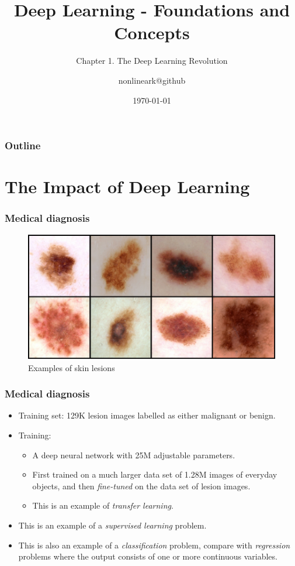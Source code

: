 \documentclass{beamer}
\title{Deep Learning - Foundations and Concepts}
\subtitle{Chapter 1. The Deep Learning Revolution}
\author{nonlineark@github}
\date{\today}
\begin{document}
\begin{frame}
    \titlepage
\end{frame}

\begin{frame}
    \frametitle{Outline}
    \tableofcontents
\end{frame}

\section{The Impact of Deep Learning}

\begin{frame}
    \frametitle{Medical diagnosis}
    \begin{figure}
        \caption{Examples of skin lesions}
        \includegraphics{Figure_1.pdf}
    \end{figure}
\end{frame}

\begin{frame}
    \frametitle{Medical diagnosis}
    \begin{itemize}
        \item Training set: 129K lesion images labelled as either malignant or benign.
        \item Training:
        \begin{itemize}
            \item A deep neural network with 25M adjustable parameters.
            \item First trained on a much larger data set of 1.28M images of everyday objects, and then \emph{fine-tuned} on the data set of lesion images.
            \item This is an example of \emph{transfer learning}.
        \end{itemize}
        \item This is an example of a \emph{supervised learning} problem.
        \item This is also an example of a \emph{classification} problem, compare with \emph{regression} problems where the output consists of one or more continuous variables.
    \end{itemize}
\end{frame}
\end{document}
